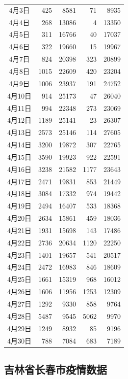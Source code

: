 \documentclass[12pt]{article}
\begin{document}
\begin{longtable}[c]{|c|r|r|r|r|}
4月3日 & 425 & 8581 & 71 & 8935 \\
4月4日 & 268 & 13086 & 4 & 13350 \\
4月5日 & 311 & 16766 & 40 & 17037 \\
4月6日 & 322 & 19660 & 15 & 19967 \\
4月7日 & 824 & 20398 & 323 & 20899 \\
4月8日 & 1015 & 22609 & 420 & 23204 \\
4月9日 & 1006 & 23937 & 191 & 24752 \\
4月10日 & 914 & 25173 & 47 & 26040 \\
4月11日 & 994 & 22348 & 273 & 23069 \\
4月12日 & 1189 & 25141 & 23 & 26307 \\
4月13日 & 2573 & 25146 & 114 & 27605 \\
4月14日 & 3200 & 19872 & 307 & 22765 \\
4月15日 & 3590 & 19923 & 922 & 22591 \\
4月16日 & 3238 & 21582 & 1177 & 23643 \\
4月17日 & 2471 & 19831 & 853 & 21449 \\
4月18日 & 3084 & 17332 & 974 & 19442 \\
4月19日 & 2494 & 16407 & 533 & 18368 \\
4月20日 & 2634 & 15861 & 459 & 18036 \\
4月21日 & 1931 & 15698 & 143 & 17486 \\
4月22日 & 2736 & 20634 & 1120 & 22250 \\
4月23日 & 1401 & 19657 & 541 & 20517 \\
4月24日 & 2472 & 16983 & 846 & 18609 \\
4月25日 & 1661 & 15319 & 968 & 16012 \\
4月26日 & 1606 & 11956 & 1253 & 12309 \\
4月27日 & 1292 & 9330 & 858 & 9764 \\
4月28日 & 5487 & 9545 & 5062 & 9970 \\
4月29日 & 1249 & 8932 & 85 & 9196 \\
4月30日 & 788 & 7084 & 683 & 7189 \\
\hline
\end{longtable}

\subsection{吉林省长春市疫情数据}
\end{document}
